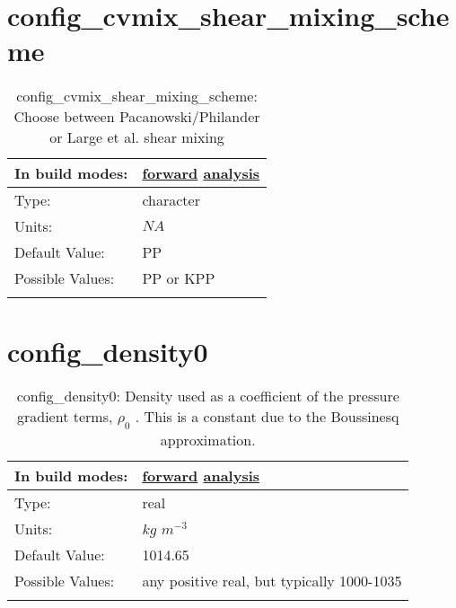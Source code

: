 \section[config\_cvmix\_shear\_mixing\_scheme]{config\_cvmix\_shear\_mixing\_scheme}
\label{sec:nm_sec_config_cvmix_shear_mixing_scheme}
\begin{center}
\begin{longtable}{| p{2.0in} || p{4.0in} |}
    \hline
    In build modes: & \hyperref[subsec:forward_nm_tab_cvmix]{forward} \hyperref[subsec:analysis_nm_tab_cvmix]{analysis} \\
    \hline
    Type: & character \\
    \hline
    Units: & $NA$ \\
    \hline
    Default Value: & PP \\
    \hline
    Possible Values: & PP or KPP \\
    \hline
    \caption{config\_cvmix\_shear\_mixing\_scheme: Choose between Pacanowski/Philander or Large et al. shear mixing}
\end{longtable}
\end{center}
\section[config\_density0]{config\_density0}
\label{sec:nm_sec_config_density0}
\begin{center}
\begin{longtable}{| p{2.0in} || p{4.0in} |}
    \hline
    In build modes: & \hyperref[subsec:forward_nm_tab_pressure_gradient]{forward} \hyperref[subsec:analysis_nm_tab_pressure_gradient]{analysis} \\
    \hline
    Type: & real \\
    \hline
    Units: & $kg$ $m^{-3}$ \\
    \hline
    Default Value: & 1014.65 \\
    \hline
    Possible Values: & any positive real, but typically 1000-1035 \\
    \hline
    \caption{config\_density0:  Density used as a coefficient of the pressure gradient terms,  $\rho_0$ . This is a constant due to the Boussinesq approximation.}
\end{longtable}
\end{center}
